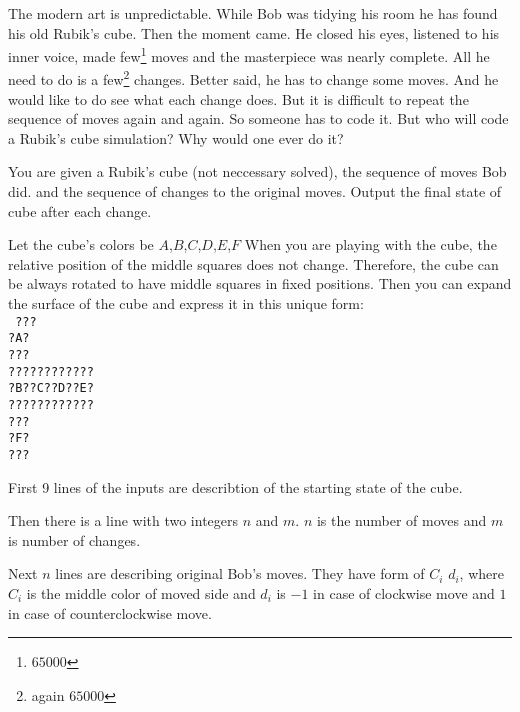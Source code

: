 





The modern art is unpredictable.
While Bob was tidying his room he has found his old Rubik's cube.
Then the moment came.
He closed his eyes, listened to his inner voice,
made few\footnote{$65000$}
moves and the masterpiece was nearly complete.
All he need to do is a few\footnote{again $65000$}
changes. Better said, he has to change some moves.
And he would like to do see what each change does.
But it is difficult to repeat the sequence
of moves again and again.
So someone has to code it.
But who will code a Rubik's cube simulation?
Why would one ever do it?


You are given a Rubik's cube (not neccessary solved),
the sequence of moves Bob did.
and the sequence of changes to the original moves.
Output the final state of cube after each change.


Let the cube's colors be $A$,$B$,$C$,$D$,$E$,$F$
When you are playing with the cube,
the relative position of the middle squares
does not change. Therefore, the cube
can be always rotated to have middle
squares in fixed positions.
Then you can expand the surface of the cube
and express it in this unique form:\\
\texttt{
???\\
?A?\\
???\\
????????????\\
?B??C??D??E?\\
????????????\\
???\\
?F?\\
???\\
}


First 9 lines of the inputs are describtion of
the starting state of the cube.

Then there is a line with two integers $n$ and $m$.
$n$ is the number of moves and $m$ is number of changes.

Next $n$ lines are describing original Bob's moves.
They have form of $C_i$ $d_i$,
where $C_i$ is the middle color of moved side
and $d_i$ is $-1$ in case of clockwise move
and $1$ in case of counterclockwise move.


